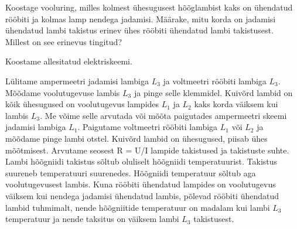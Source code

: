 
Koostage vooluring, milles kolmest ühesugusest hõõglambist kaks on ühendatud rööbiti ja kolmas lamp nendega jadamisi. Määrake, mitu korda on jadamisi ühendatud lambi takistus erinev ühes rööbiti ühendatud lambi takistusest. Millest on see erinevus tingitud?

\hint

\solu
Koostame allesitatud elektriskeemi.

Lülitame ampermeetri jadamisi lambiga $L_3$ ja voltmeetri rööbiti lambiga $L_3$. Mõõdame voolutugevuse lambis $L_3$ ja pinge selle klemmidel. Kuivõrd lambid on kõik ühesugused on voolutugevus lampides $L_1$ ja $L_2$ kaks korda väiksem kui lambis $L_3$. Me võime selle arvutada või mõõta paigutades ampermeetri skeemi jadamisi lambiga $L_1$. Paigutame voltmeetri rööbiti lambiga $L_1$ või $L_2$ ja mõõdame pinge lambi otstel. Kuivõrd lambid on ühesugused, piisab ühes mõõtmisest. Arvutame seosest R = U/I lampide takistused ja takistuste suhte. Lambi hõõgniidi takistus sõltub oluliselt hõõgniidi temperatuurist. Takistus suureneb temperatuuri suurenedes. Hõõgniidi temperatuur sõltub aga voolutugevusest lambis. Kuna rööbiti ühendatud lampides on voolutugevus väiksem kui nendega jadamisi ühendatud lambis, põlevad rööbiti ühendatud lambid tuhmimalt, nende hõõgniitide temperatuur on madalam kui lambi $L_3$ temperatuur ja nende taksitus on väiksem lambi $L_3$ takistusest.
\probend
